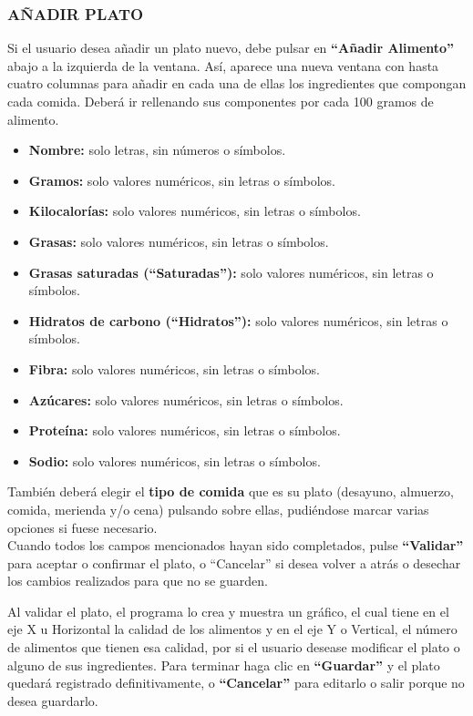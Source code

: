 \subsubsection{AÑADIR PLATO}
Si el usuario desea añadir un plato nuevo, debe pulsar en \textbf{“Añadir Alimento”} abajo a la izquierda de la ventana. Así, aparece una nueva ventana con hasta cuatro columnas para añadir en cada una de ellas los ingredientes que compongan cada comida. Deberá ir rellenando sus componentes por cada 100 gramos de alimento.
\begin{itemize}
\item	\textbf{Nombre:} solo letras, sin números o símbolos.
\item	\textbf{Gramos:} solo valores numéricos, sin letras o símbolos.
\item	\textbf{Kilocalorías:} solo valores numéricos, sin letras o símbolos.
\item	\textbf{Grasas:} solo valores numéricos, sin letras o símbolos.
\item	\textbf{Grasas saturadas (“Saturadas”):} solo valores numéricos, sin letras o símbolos.
\item	\textbf{Hidratos de carbono (“Hidratos”):} solo valores numéricos, sin letras o símbolos.
\item	\textbf{Fibra:} solo valores numéricos, sin letras o símbolos.
\item	\textbf{Azúcares:} solo valores numéricos, sin letras o símbolos.
\item	\textbf{Proteína:} solo valores numéricos, sin letras o símbolos.
\item	\textbf{Sodio:} solo valores numéricos, sin letras o símbolos.
\end{itemize}

También deberá elegir el \textbf{tipo de comida} que es su plato (desayuno, almuerzo, comida, merienda y/o cena) pulsando sobre ellas, pudiéndose marcar varias opciones si fuese necesario.\\

Cuando todos los campos mencionados hayan sido completados, pulse \textbf{“Validar”} para aceptar o confirmar el plato, o “Cancelar” si desea volver a atrás o desechar los cambios realizados para que no se guarden.\\

Al validar el plato, el programa lo crea y muestra un gráfico, el cual tiene en el eje X u Horizontal la calidad de los alimentos y en el eje Y o Vertical, el número de alimentos que tienen esa calidad, por si el usuario desease modificar el plato o alguno de sus ingredientes. Para terminar haga clic en \textbf{“Guardar”} y el plato quedará registrado definitivamente, o \textbf{“Cancelar”} para editarlo o salir porque no desea guardarlo.\\

